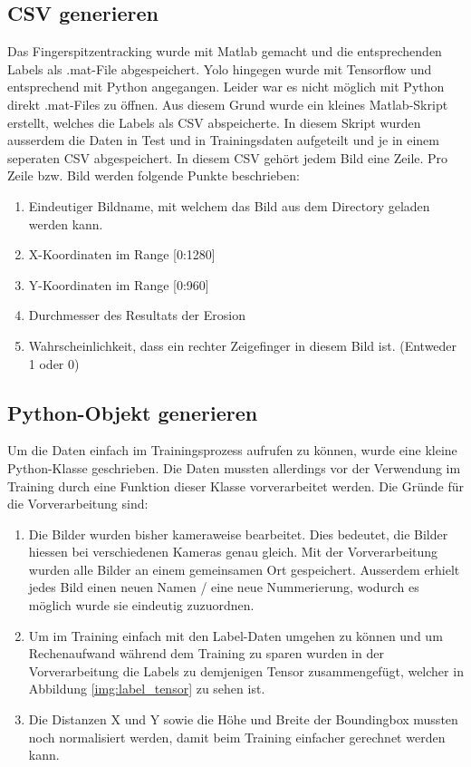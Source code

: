 \subsection{CSV generieren}
Das Fingerspitzentracking wurde mit Matlab gemacht und die entsprechenden Labels als .mat-File abgespeichert.
Yolo hingegen wurde mit Tensorflow und entsprechend mit Python angegangen. 
Leider war es nicht möglich mit Python direkt .mat-Files zu öffnen. 
Aus diesem Grund wurde ein kleines Matlab-Skript erstellt, welches die Labels als CSV abspeicherte. 
In diesem Skript wurden ausserdem die Daten in Test und in Trainingsdaten aufgeteilt und je in einem seperaten CSV abgespeichert.
In diesem CSV gehört jedem Bild eine Zeile. 
Pro Zeile bzw. Bild werden folgende Punkte beschrieben:
\begin{enumerate}
\item Eindeutiger Bildname, mit welchem das Bild aus dem Directory geladen werden kann. 
\item X-Koordinaten im Range [0:1280]
\item Y-Koordinaten im Range [0:960]
\item Durchmesser des Resultats der Erosion
\item Wahrscheinlichkeit, dass ein rechter Zeigefinger in diesem Bild ist. 
(Entweder 1 oder 0)
\end{enumerate}


\subsection{Python-Objekt generieren}
Um die Daten einfach im Trainingsprozess aufrufen zu können, wurde eine kleine Python-Klasse geschrieben.
Die Daten mussten allerdings vor der Verwendung im Training durch eine Funktion dieser Klasse vorverarbeitet werden.
Die Gründe für die Vorverarbeitung sind: 
\begin{enumerate}
\item Die Bilder wurden bisher kameraweise bearbeitet.
Dies bedeutet, die Bilder hiessen bei verschiedenen Kameras genau gleich.
Mit der Vorverarbeitung wurden alle Bilder an einem gemeinsamen Ort gespeichert.
Ausserdem erhielt jedes Bild einen neuen Namen / eine neue Nummerierung, wodurch es möglich wurde sie eindeutig zuzuordnen. 
\item Um im Training einfach mit den Label-Daten umgehen zu können und um Rechenaufwand während dem Training zu sparen wurden in der Vorverarbeitung die Labels zu demjenigen Tensor zusammengefügt, welcher in Abbildung \ref{img:label_tensor} zu sehen ist.
\item Die Distanzen X und Y sowie die Höhe und Breite der Boundingbox mussten noch normalisiert werden, damit beim Training einfacher gerechnet werden kann.
\end{enumerate}
